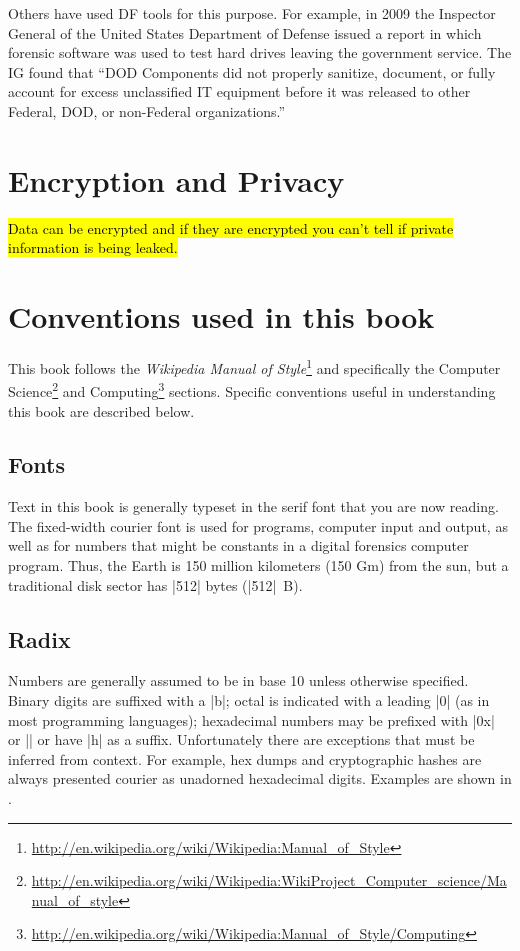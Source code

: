 Others have used DF tools for this purpose. For example, in 2009 the
Inspector General of the United States Department of Defense issued a
report in which forensic software was used to test hard drives leaving
the government service. The IG found that ``DOD Components did not
properly sanitize, document, or fully account for excess unclassified
IT equipment before it was released to other Federal, DOD, or
non-Federal organizations.''\cite{D-2009-104}



\section{Encryption and Privacy}
\hl{Data can be encrypted and if they are encrypted you can't tell if
  private information is being leaked.}

\section{Conventions used in this book}
This book follows the \emph{Wikipedia Manual of
  Style}\footnote{\url{http://en.wikipedia.org/wiki/Wikipedia:Manual_of_Style}}
and specifically the Computer
Science\footnote{\url{http://en.wikipedia.org/wiki/Wikipedia:WikiProject_Computer_science/Manual_of_style}}
  and
  Computing\footnote{\url{http://en.wikipedia.org/wiki/Wikipedia:Manual_of_Style/Computing}}
  sections. Specific conventions useful in understanding this book are
  described below.

\subsection{Fonts}

Text in this book is generally typeset in the serif font that you are
now reading. The fixed-width courier font is used for programs,
computer input and output, as well as for numbers that might
be constants in a digital forensics computer program. Thus,
the Earth is 150 million kilometers (150 Gm) from the sun, but a
traditional disk sector has |512| bytes (|512|~B).

\subsection{Radix}
Numbers are generally assumed to be in base 10 unless otherwise
specified. Binary digits are suffixed with a |b|; octal
is indicated with a leading |0| (as in most programming
languages); hexadecimal numbers may be prefixed with |0x| or |\x| or
have |h| as a suffix. Unfortunately there are
exceptions that must be inferred from context. For example, hex dumps
and cryptographic hashes are always presented courier as unadorned hexadecimal
digits. Examples are shown in .

